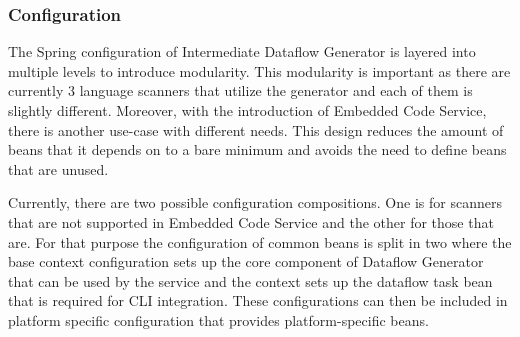 \subsubsection{Configuration}
The Spring configuration of Intermediate Dataflow Generator is layered into multiple levels to introduce modularity. This modularity is important as there are currently 3 language scanners that utilize the generator and each of them is slightly different. Moreover, with the introduction of Embedded Code Service, there is another use-case with different needs.  This design reduces the amount of beans that it depends on to a bare minimum and avoids the need to define beans that are unused.
\par
Currently, there are two possible configuration compositions. One is for scanners that are not supported in Embedded Code Service and the other for those that are. For that purpose the configuration of common beans is split in two where the base context configuration sets up the core component of Dataflow Generator that can be used by the service and the context sets up the dataflow task bean that is required for CLI integration. These configurations can then be included in platform specific configuration that provides platform-specific beans.

